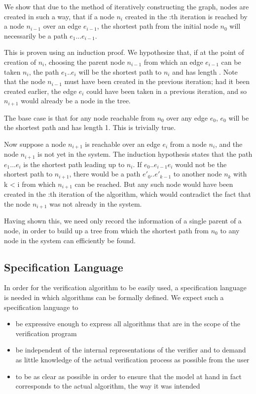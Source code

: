We show that due to the method of iteratively constructing the graph, nodes are created in such a way, that if a node $n_{i}$ created in the :th iteration is reached by a node $n_{i-1}$ over an edge $e_{i-1}$, the shortest path from the initial node $n_0$ will necessarily be a path $e_1...e_{i-1}$.

 This is proven using an induction proof. We hypothesize that, if at the point of creation of $n_i$, choosing the parent node $n_{i-1}$ from which an edge $e_{i-1}$ can be taken $n_i$, the path $e_1..e_{i}$ will be the shortest path to $n_i$ and has length . Note that the node $n_{i-1}$ must have been created in the previous iteration; had it been created earlier, the edge $e_i$ could have been taken in a previous iteration, and so $n_{i+1}$ would already be a node in the tree.

The base case is that for any node reachable from $n_0$ over any edge $e_0$, $e_0$ will be the shortest path and has length 1. This is trivially true.

Now suppose a node $n_{i+1}$ is reachable over an edge $e_i$ from a node $n_i$, and the node $n_{i+1}$ is not yet in the system. The induction hypothesis states that the path $e_1...e_i$ is the shortest path leading up to $n_i$. If $e_0..e_{i-1}e_i$ would not be the shortest path to $n_{i+1}$, there would be a path $e'_0..e'_{k-1}$ to another node $n_k$ with k < i from which $n_{i+1}$ can be reached. But any such node would have been created in the :th iteration of the algorithm, which would contradict the fact that the node $n_{i+1}$ was not already in the system.

Having shown this, we need only record the information of a single parent of a node, in order to build up a tree from which the shortest path from $n_0$ to any node in the system can efficiently be found.


\subsection{Specification Language}
\label{speclang}
In order for the verification algorithm to be easily used, a specification language is needed in which algorithms can be formally defined. We expect such a specification language to

\begin{itemize}
\item
be expressive enough to express all algorithms that are in the scope of the verification program
\item
be independent of the internal representations of the verifier and to demand as little knowledge of the actual verification process as possible from the user
\item
to be as clear as possible in order to ensure that the model at hand in fact corresponds to the actual algorithm, the way it was intended
\end{itemize}

